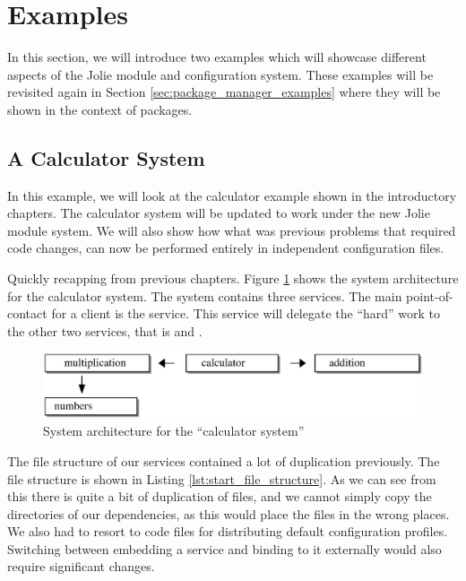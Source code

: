 \section{Examples}
\label{sec:module_examples}

In this section, we will introduce two examples which will showcase different
aspects of the Jolie module and configuration system. These examples will be
revisited again in Section \ref{sec:package_manager_examples} where they will
be shown in the context of packages.

\subsection{A Calculator System}

In this example, we will look at the calculator example shown in the
introductory chapters. The calculator system will be updated to work under the
new Jolie module system. We will also show how what was previous problems that
required code changes, can now be performed entirely in independent
configuration files.

Quickly recapping from previous chapters.  Figure \ref{fig:simple_calc} shows
the system architecture for the calculator system. The system contains three
services. The main point-of-contact for a client is the 
service. This service will delegate the ``hard'' work to the other two
services, that is  and .

\begin{figure}[H]
\centering
\includegraphics[width=1.0\textwidth]{modules/simple_calc.eps}
\caption{System architecture for the ``calculator system''}
\label{fig:simple_calc}
\end{figure}

The file structure of our services contained a lot of duplication previously.
The file structure is shown in Listing \ref{lst:start_file_structure}. As we
can see from this there is quite a bit of duplication of files, and we cannot
simply copy the directories of our dependencies, as this would place the files
in the wrong places. We also had to resort to code files for distributing
default configuration profiles. Switching between embedding a service and
binding to it externally would also require significant changes.

